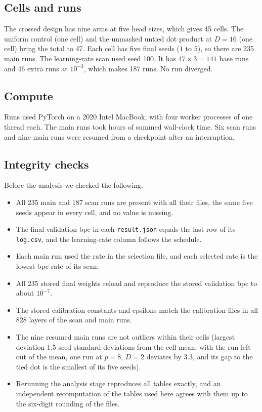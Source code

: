 \documentclass[11pt]{article}
\begin{document}
\subsection{Cells and runs}

The crossed design has nine arms at five head sizes, which gives 45 cells.
The uniform control (one cell) and the unmasked untied dot product at $D=16$ (one cell) bring the total to 47.
Each cell has five final seeds ($1$ to $5$), so there are 235 main runs.
The learning-rate scan used seed 100.
It has $47\times3=141$ base runs and 46 extra runs at $10^{-3}$, which makes 187 runs.
No run diverged.

\subsection{Compute}

Runs used PyTorch \citep{paszke2019} on a 2020 Intel MacBook, with four worker processes of one thread each.
The main runs took \totalHoursMain{} hours of summed wall-clock time.
Six scan runs and nine main runs were resumed from a checkpoint after an interruption.

\subsection{Integrity checks}

Before the analysis we checked the following.
\begin{itemize}
\item All 235 main and 187 scan runs are present with all their files, the same five seeds appear in every cell, and no value is missing.
\item The final validation bpc in each \texttt{result.json} equals the last row of its \texttt{log.csv}, and the learning-rate column follows the schedule.
\item Each main run used the rate in the selection file, and each selected rate is the lowest-bpc rate of its scan.
\item All 235 stored final weights reload and reproduce the stored validation bpc to about $10^{-7}$.
\item The stored calibration constants and epsilons match the calibration files in all 828 layers of the scan and main runs.
\item The nine resumed main runs are not outliers within their cells (largest deviation 1.5 seed standard deviations from the cell mean; with the run left out of the mean, one run at $p=8$, $D=2$ deviates by 3.3, and its gap to the tied dot is the smallest of its five seeds).
\item Rerunning the analysis stage reproduces all tables exactly, and an independent recomputation of the tables used here agrees with them up to the six-digit rounding of the files.
\end{itemize}
\end{document}
